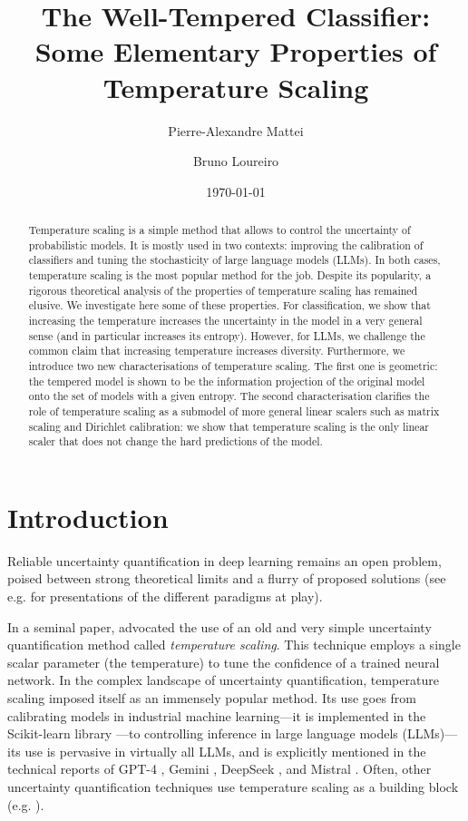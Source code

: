 \documentclass[10pt,dvipsnames]{article}
\title{The Well-Tempered Classifier: \\ Some Elementary Properties of Temperature Scaling}
\author[1]{Pierre-Alexandre Mattei}
\author[2]{Bruno Loureiro}
\affil[1]{\small Université Côte d'Azur, Inria, CNRS, LJAD, France}
\affil[2]{\small Département d’Informatique, École Normale Supérieure - PSL, CNRS, France}
\date{\today}
\theoremstyle{plain}
\theoremstyle{definition}
\theoremstyle{remark}
\begin{document}
\maketitle
\begin{abstract}
  Temperature scaling is a simple method that allows to control the uncertainty of probabilistic models. It is mostly used in two contexts: improving the calibration of classifiers and tuning the stochasticity of large language models (LLMs). In both cases, temperature scaling is the most popular method for the job. Despite its popularity, a rigorous theoretical analysis of the properties of temperature scaling has remained elusive. We investigate here some of these properties. For classification, we show that increasing the temperature increases the uncertainty in the model in a very general sense (and in particular increases its entropy). However, for LLMs, we challenge the common claim that increasing temperature increases diversity. Furthermore, we introduce two new characterisations of temperature scaling. The first one is geometric: the tempered model is shown to be the information projection of the original model onto the set of models with a given entropy. The second characterisation clarifies the role of temperature scaling as a submodel of more general linear scalers such as matrix scaling and Dirichlet calibration: we show that temperature scaling is the only linear scaler that does not change the hard predictions of the model.
\end{abstract}

\section{Introduction}
\label{sec:intro}
Reliable uncertainty quantification in deep learning remains an open problem, poised between strong theoretical limits \citep{foygel2021limits} and a flurry of proposed solutions (see e.g. \citealp{silva2023classifier,angelopoulos2023conformal, ulmer2023prior, papamarkou2024position} for presentations of the different paradigms at play).

In a seminal paper, \citet{guo2017calibration} advocated the use of an old and very simple uncertainty quantification method called \emph{temperature scaling}. This technique employs a single scalar parameter (the temperature) to tune the confidence of a trained neural network. In the complex landscape of uncertainty quantification, temperature scaling imposed itself as an immensely popular method. Its use goes from calibrating models in industrial machine learning---it is implemented in the Scikit-learn library \citep{scikit-learn}---to controlling inference in large language models (LLMs)---its use is pervasive in virtually all LLMs, and is explicitly mentioned in the technical reports of GPT-4 \citep{achiam2023gpt}, Gemini \citep{team2023gemini}, DeepSeek \citep{liu2024deepseek}, and Mistral \citep{rastogi2025magistral}. Often, other uncertainty quantification techniques use temperature scaling as a building block (e.g. \citealp{berta2025rethinking,gibbs2025conformal}).
\end{document}
